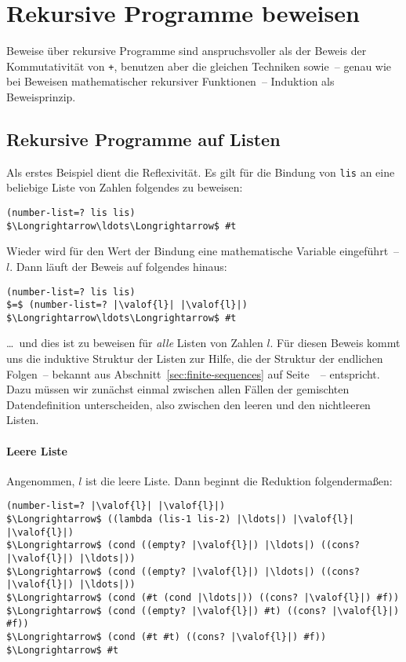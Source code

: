 \section{Rekursive Programme beweisen}
\label{sec:rek-scheme-beweisen}

Beweise über rekursive Programme sind anspruchsvoller als der
Beweis der Kommutativität von \lstinline{+}, benutzen aber die gleichen
Techniken sowie~-- genau wie bei Beweisen mathematischer rekursiver
Funktionen~-- Induktion als Beweisprinzip. 

\subsection{Rekursive Programme auf Listen}

Als erstes Beispiel dient
die Reflexivität.  Es gilt für die Bindung von \lstinline{lis} an eine
beliebige Liste von Zahlen folgendes zu beweisen:
%
\begin{lstlisting}
(number-list=? lis lis)
$\Longrightarrow\ldots\Longrightarrow$ #t
\end{lstlisting}
%
Wieder wird für den Wert der Bindung eine mathematische Variable
eingeführt~-- $l$.  Dann läuft der Beweis auf folgendes hinaus:
%
\begin{lstlisting}
(number-list=? lis lis)
$=$ (number-list=? |\valof{l}| |\valof{l}|)
$\Longrightarrow\ldots\Longrightarrow$ #t
\end{lstlisting}
%
\ldots~und dies ist zu beweisen für \emph{alle} Listen von Zahlen $l$.
Für diesen Beweis kommt uns die induktive Struktur der Listen zur
Hilfe, die der Struktur der endlichen Folgen~-- bekannt aus
Abschnitt~\ref{sec:finite-sequences} auf
Seite~\pageref{sec:finite-sequences}~-- entspricht.  Dazu müssen wir
zunächst einmal zwischen allen Fällen der gemischten
Datendefinition unterscheiden, also zwischen den leeren und den nichtleeren Listen.

\paragraph{Leere Liste}
Angenommen, $l$ ist die leere Liste.  Dann beginnt die Reduktion
folgendermaßen:
%
\begin{lstlisting}
(number-list=? |\valof{l}| |\valof{l}|)
$\Longrightarrow$ ((lambda (lis-1 lis-2) |\ldots|) |\valof{l}| |\valof{l}|)
$\Longrightarrow$ (cond ((empty? |\valof{l}|) |\ldots|) ((cons? |\valof{l}|) |\ldots|))
$\Longrightarrow$ (cond ((empty? |\valof{l}|) |\ldots|) ((cons? |\valof{l}|) |\ldots|))
$\Longrightarrow$ (cond (#t (cond |\ldots|)) ((cons? |\valof{l}|) #f))
$\Longrightarrow$ (cond ((empty? |\valof{l}|) #t) ((cons? |\valof{l}|) #f))
$\Longrightarrow$ (cond (#t #t) ((cons? |\valof{l}|) #f))
$\Longrightarrow$ #t
\end{lstlisting}
%

